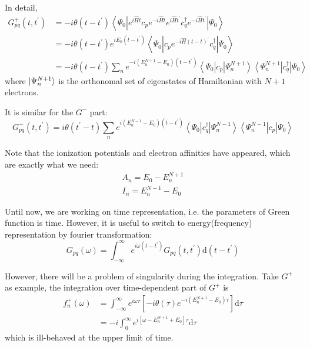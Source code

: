 \documentclass[bachelor, english]{ustcthesis}
\begin{document}
In detail,
$$
\begin{aligned}
	G_{p q}^{+}\left(t, t^{\prime}\right) 
	&=-i \theta\left(t-t^{\prime}\right)\left\langle\Psi_{0}\left|e^{i \hat{H} t} c_{p} e^{-i \hat{H} t} e^{i \hat{H} t^{\prime}} c_{q}^{\dagger} e^{-i \hat{H} t^{\prime}}\right| \Psi_{0}\right\rangle
	\\
	&=- i \theta\left(t-t^{\prime}\right) e^{i E_{0}\left(t-t^{\prime}\right)}\left\langle\Psi_{0}\left|c_{p} e^{-i \hat{H}(t-t)^{\prime}} c_{q}^{\dagger}\right| \Psi_{0}\right\rangle
	\\
	&=-i \theta\left(t-t^{\prime}\right) \sum_{n} e^{-i\left(E_{n}^{N+1}-E_{0}\right)\left(t-t^{\prime}\right)}\left\langle\Psi_{0}\left|c_{p}\right| \Psi_{n}^{N+1}\right\rangle\left\langle\Psi_{n}^{N+1}\left|c_{q}^{\dagger}\right| \Psi_{0}\right\rangle
\end{aligned}
$$
where $\ket{\Psi_n^{N+1}}$ is the orthonomal set of eigenstates of Hamiltonian with $N+1$ electrons.

It is similar for the $G^{-}$ part:
$$
G_{p q}^{-}\left(t, t^{\prime}\right)=i \theta\left(t^{\prime}-t\right) \sum_{n} e^{i\left(E_{n}^{N-1}-E_{0}\right)\left(t-t^{\prime}\right)}\left\langle\Psi_{0}\left|c_{q}^{\dagger}\right| \Psi_{n}^{N-1}\right\rangle\left\langle\Psi_{n}^{N-1}\left|c_{p}\right| \Psi_{0}\right\rangle
$$

Note that the ionization potentials and electron affinities have appeared, which are exactly what we need:
$$
\begin{array}{l}{A_{n}=E_{0}-E_{n}^{N+1}} \\ {I_{n}=E_{n}^{N-1}-E_{0}}\end{array}
$$

Until now, we are working on time representation, i.e. the parameters of Green function is time.
However, it is useful to switch to energy(frequency) representation by fourier transformation:
$$
G_{p q}(\omega)=\int_{-\infty}^{\infty} e^{i \omega\left(t-t^{\prime}\right)} G_{p q}\left(t, t^{\prime}\right) \mathrm{d}\left(t-t^{\prime}\right)
$$

However, there will be a problem of singularity during the integration.
Take $G^{+}$ as example, the integration over time-dependent part of $G^{+}$ is
$$
\begin{aligned} f_{n}^{+}(\omega) &=\int_{-\infty}^{\infty} e^{i \omega \tau}\left[-i \theta(\tau) e^{-i\left(E_{n}^{N+1}-E_{0}\right) \tau}\right] \mathrm{d} \tau \\ &=-i \int_{0}^{\infty} e^{i\left[\omega-E_{n}^{N+1}+E_{0}\right] \tau} \mathrm{d} \tau \end{aligned}
$$
which is ill-behaved at the upper limit of time.
\end{document}
